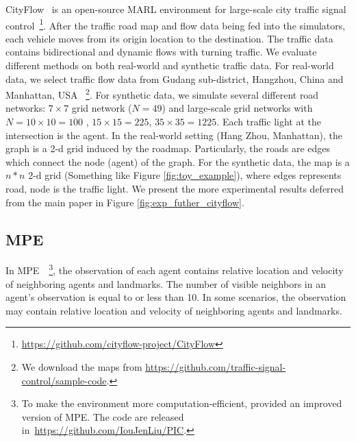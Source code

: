 \documentclass[11pt,a4paper]{article}
\theoremstyle{definition}
\begin{document}
CityFlow~\citep{tang2019cityflow} is an open-source MARL environment for large-scale city traffic signal control~\footnote{\url{https://github.com/cityflow-project/CityFlow}}. 
After the traffic road map and flow data being fed into the simulators, each vehicle moves from its origin location to the destination. The traffic data contains bidirectional and dynamic flows with turning traffic.
We evaluate different methods on both real-world and synthetic traffic data.
For real-world data, we select traffic flow data from Gudang sub-district, Hangzhou, China  and Manhattan, USA ~\footnote{We download the maps from \url{https://github.com/traffic-signal-control/sample-code}.}.
For synthetic data, we simulate several different road networks: $7\times7$ grid network ($N=49$) and  large-scale grid networks with  $N=10\times10=100$ , $15\times 15=225$, $35\times35=1225$. Each traffic light at the intersection is the agent. In the real-world setting (Hang Zhou, Manhattan), the graph is a 2-d grid induced by the roadmap. Particularly,  the roads are edges which connect the node (agent) of the graph. For the synthetic data, the map is a $n*n$ 2-d grid (Something like	Figure \ref{fig:toy_example}), where edges represents road, node is the traffic light. We present the more experimental results deferred from the main paper in Figure \ref{fig:exp_futher_cityflow}.


\subsection{MPE}

In MPE~\citep{mordatch2017emergence}~\footnote{To make the environment more computation-efficient, \citet{liu2019pic} provided an improved version of MPE. The code are released in~\url{https://github.com/IouJenLiu/PIC}.}, the observation of each agent contains relative location and velocity of neighboring agents and landmarks.
The number of visible neighbors in an agent’s observation is equal to or less than 10. 
In some scenarios, the observation may contain relative location and velocity of neighboring agents and landmarks.
\end{document}
